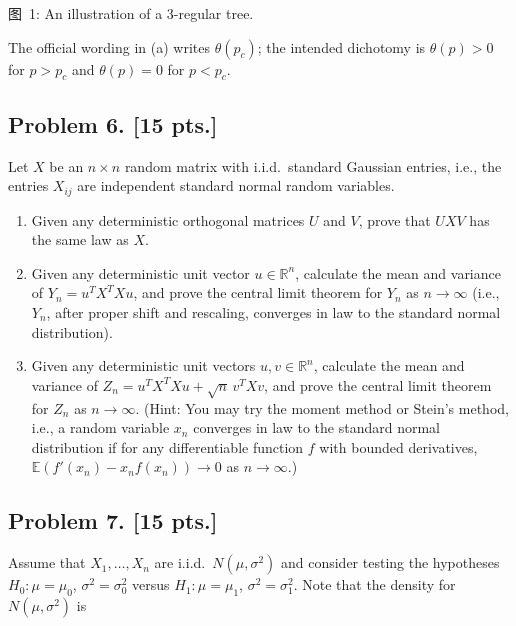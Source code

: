 \documentclass[11pt,a4paper]{article}
\begin{document}
\begin{center}
\small
图~1: An illustration of a 3-regular tree.
\end{center}

\begin{remark*}
The official wording in (a) writes \( \theta(p_c) \); the intended dichotomy is \( \theta(p) > 0 \) for \( p > p_c \) and \( \theta(p) = 0 \) for \( p < p_c \).
\end{remark*}

\subsection{Problem 6. [15 pts.]}
Let \( X \) be an \( n \times n \) random matrix with i.i.d.\ standard Gaussian entries, i.e., the entries \( X_{ij} \) are independent standard normal random variables.
\begin{enumerate}[label=(\alph*)]
    \item Given any deterministic orthogonal matrices \( U \) and \( V \), prove that \( UXV \) has the same law as \( X \).
    \item Given any deterministic unit vector \( u \in \mathbb{R}^n \), calculate the mean and variance of \( Y_n = u^T X^T X u \), and prove the central limit theorem for \( Y_n \) as \( n \to \infty \) (i.e., \( Y_n \), after proper shift and rescaling, converges in law to the standard normal distribution).
    \item Given any deterministic unit vectors \( u, v \in \mathbb{R}^n \), calculate the mean and variance of \( Z_n = u^T X^T X u + \sqrt{n}\, v^T X v \), and prove the central limit theorem for \( Z_n \) as \( n \to \infty \). (Hint: You may try the moment method or Stein's method, i.e., a random variable \( x_n \) converges in law to the standard normal distribution if for any differentiable function \( f \) with bounded derivatives, \( \mathbb{E}(f'(x_n) - x_n f(x_n)) \to 0 \) as \( n \to \infty \).)
\end{enumerate}

\subsection{Problem 7. [15 pts.]}
Assume that \( X_1, \dots, X_n \) are i.i.d.\ \( N(\mu, \sigma^2) \) and consider testing the hypotheses \( H_0 : \mu = \mu_0 \), \( \sigma^2 = \sigma_0^2 \) versus \( H_1 : \mu = \mu_1 \), \( \sigma^2 = \sigma_1^2 \). Note that the density for \( N(\mu, \sigma^2) \) is
\end{document}
